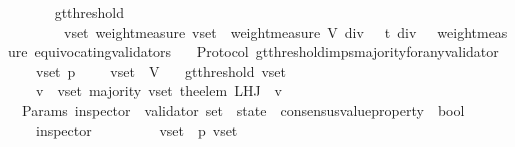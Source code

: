 \begin{isabellebody}
\ \ \isanewline
\ \ \ \ {\isachardoublequoteopen}gt{\isacharunderscore}threshold\ \isanewline
\ \ \ \ \ \ \ {\isacharequal}\ {\isacharparenleft}{\isasymlambda}{\isacharparenleft}v{\isacharunderscore}set{\isacharcomma}\ {\isasymsigma}{\isacharparenright}{\isachardot}{\isacharparenleft}weight{\isacharunderscore}measure\ v{\isacharunderscore}set\ {\isachargreater}\ {\isacharparenleft}weight{\isacharunderscore}measure\ V{\isacharparenright}\ div\ {}\ {\isacharplus}\ t\ div\ {}\ {\isacharminus}\ weight{\isacharunderscore}measure\ {\isacharparenleft}equivocating{\isacharunderscore}validators\ {\isasymsigma}{\isacharparenright}{\isacharparenright}{\isacharparenright}{\isachardoublequoteclose}\isanewline
\isanewline
\isanewline
{}\isamarkupfalse%
\ {\isacharparenleft}\ Protocol{\isacharparenright}\ gt{\isacharunderscore}threshold{\isacharunderscore}imps{\isacharunderscore}majority{\isacharunderscore}for{\isacharunderscore}any{\isacharunderscore}validator\ {\isacharcolon}\isanewline
\ \ {\isachardoublequoteopen}{\isasymforall}\ {\isasymsigma}\ v{\isacharunderscore}set\ p{\isachardot}\ {\isasymsigma}\ {\isasymin}\ {\isasymSigma}\ {\isasymand}\ v{\isacharunderscore}set\ {\isasymsubseteq}\ V\isanewline
\ \ {\isasymlongrightarrow}\ gt{\isacharunderscore}threshold\ {\isacharparenleft}v{\isacharunderscore}set{\isacharcomma}\ {\isasymsigma}{\isacharparenright}\ \isanewline
\ \ {\isasymlongrightarrow}\ {\isacharparenleft}{\isasymforall}\ v\ {\isasymin}\ v{\isacharunderscore}set{\isachardot}\ majority\ {\isacharparenleft}v{\isacharunderscore}set{\isacharcomma}\ the{\isacharunderscore}elem\ {\isacharparenleft}L{\isacharunderscore}H{\isacharunderscore}J\ {\isasymsigma}\ v{\isacharparenright}{\isacharparenright}{\isacharparenright}{\isachardoublequoteclose}\isanewline
%
\isadelimproof
\ \ %
\endisadelimproof
%
\isatagproof
{}\isamarkupfalse%
%
\endisatagproof
{\isafoldproof}%
%
\isadelimproof
\isanewline
%
\endisadelimproof
\isanewline
{}\isamarkupfalse%
\ {\isacharparenleft}\ Params{\isacharparenright}\ inspector\ {\isacharcolon}{\isacharcolon}\ {\isachardoublequoteopen}{\isacharparenleft}validator\ set\ {\isacharasterisk}\ state\ {\isacharasterisk}\ consensus{\isacharunderscore}value{\isacharunderscore}property{\isacharparenright}\ {\isasymRightarrow}\ bool{\isachardoublequoteclose}\isanewline
\ \ \isanewline
\ \ \ \ {\isachardoublequoteopen}inspector\ \isanewline
\ \ \ \ \ \ \ {\isacharequal}\ {\isacharparenleft}{\isasymlambda}{\isacharparenleft}v{\isacharunderscore}set{\isacharcomma}\ {\isasymsigma}{\isacharcomma}\ p{\isacharparenright}{\isachardot}\ v{\isacharunderscore}set\ {\isasymnoteq}\ {\isasymemptyset}\ {\isasymand}\isanewline

\end{isabellebody}
